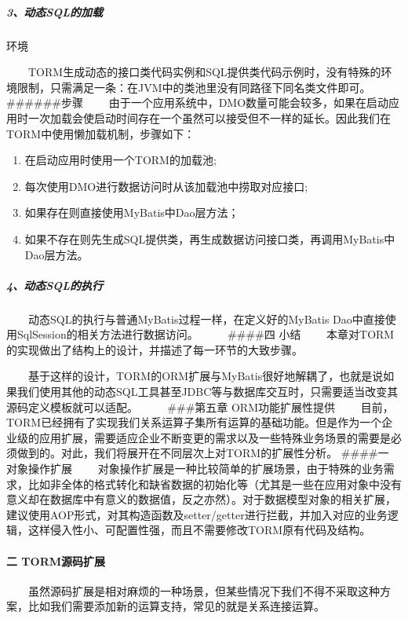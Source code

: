 \documentclass[]{article}
\begin{document}
\subparagraph{3、动态SQL的加载}\label{ux52a8ux6001sqlux7684ux52a0ux8f7d}

环境

　　TORM生成动态的接口类代码实例和SQL提供类代码示例时，没有特殊的环境限制，只需满足一条：在JVM中的类池里没有同路径下同名类文件即可。
\#\#\#\#\#\#步骤
　　由于一个应用系统中，DMO数量可能会较多，如果在启动应用时一次加载会使启动时间存在一个虽然可以接受但不一样的延长。因此我们在TORM中使用懒加载机制，步骤如下：

\begin{enumerate}
\def\labelenumi{\arabic{enumi}.}
\itemsep1pt\parskip0pt
\item
  在启动应用时使用一个TORM的加载池;
\item
  每次使用DMO进行数据访问时从该加载池中捞取对应接口;
\item
  如果存在则直接使用MyBatis中Dao层方法；
\item
  如果不存在则先生成SQL提供类，再生成数据访问接口类，再调用MyBatis中Dao层方法。
\end{enumerate}

\subparagraph{4、动态SQL的执行}\label{ux52a8ux6001sqlux7684ux6267ux884c}

　　动态SQL的执行与普通MyBatis过程一样，在定义好的MyBatis
Dao中直接使用SqlSession的相关方法进行数据访问。 　　 \#\#\#\#四 小结
　　本章对TORM的实现做出了结构上的设计，并描述了每一环节的大致步骤。

　　基于这样的设计，TORM的ORM扩展与MyBatis很好地解耦了，也就是说如果我们使用其他的动态SQL工具甚至JDBC等与数据库交互时，只需要适当改变其源码定义模板就可以适配。
　　 \#\#\#第五章 ORM功能扩展性提供
　　目前，TORM已经拥有了实现我们关系运算子集所有运算的基础功能。但是作为一个企业级的应用扩展，需要适应企业不断变更的需求以及一些特殊业务场景的需要是必须做到的。对此，我们将展开在不同层次上对TORM的扩展性分析。
\#\#\#\#一 对象操作扩展
　　对象操作扩展是一种比较简单的扩展场景，由于特殊的业务需求，比如非全体的格式转化和缺省数据的初始化等（尤其是一些在应用对象中没有意义却在数据库中有意义的数据值，反之亦然）。对于数据模型对象的相关扩展，建议使用AOP形式，对其构造函数及setter/getter进行拦截，并加入对应的业务逻辑，这样侵入性小、可配置性强，而且不需要修改TORM原有代码及结构。

\paragraph{二 TORM源码扩展}\label{ux4e8c-tormux6e90ux7801ux6269ux5c55}

　　虽然源码扩展是相对麻烦的一种场景，但某些情况下我们不得不采取这种方案，比如我们需要添加新的运算支持，常见的就是关系连接运算。　　
\end{document}
